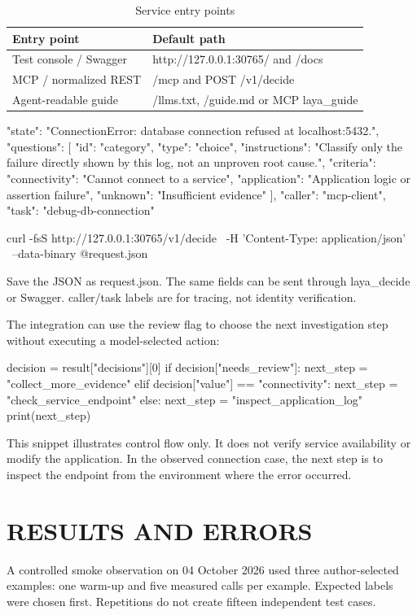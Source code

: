 \documentclass[10pt,a4paper]{article}
\begin{document}
\begin{table}[H]
\centering\small
\renewcommand{\arraystretch}{1.15}
\begin{tabularx}{\linewidth}{@{}YY@{}}
\toprule
\textbf{Entry point} & \textbf{Default path} \\
\midrule
Test console / Swagger & http://127.0.0.1:30765/  and  /docs \\
MCP / normalized REST & /mcp  and  POST /v1/decide \\
Agent-readable guide & /llms.txt, /guide.md or MCP laya\_guide \\
\bottomrule
\end{tabularx}
\caption{Service entry points}
\end{table}
\begin{Code}
{
  "state": "ConnectionError: database connection refused at localhost:5432.",
  "questions": [{
    "id": "category", "type": "choice",
    "instructions":
      "Classify only the failure directly shown by this log, not an unproven root cause.",
    "criteria": {
      "connectivity": "Cannot connect to a service",
      "application": "Application logic or assertion failure",
      "unknown": "Insufficient evidence"
    }
  }],
  "caller": "mcp-client", "task": "debug-db-connection"
}
\end{Code}
\begin{Code}
curl -fsS http://127.0.0.1:30765/v1/decide \
  -H 'Content-Type: application/json' \
  --data-binary @request.json
\end{Code}
Save the JSON as request.json. The same fields can be sent through laya\_decide or Swagger. caller/task labels are for tracing, not identity verification.


The integration can use the review flag to choose the next investigation step without executing a model-selected action:
\begin{Code}
decision = result["decisions"][0]
if decision["needs_review"]:
    next_step = "collect_more_evidence"
elif decision["value"] == "connectivity":
    next_step = "check_service_endpoint"
else:
    next_step = "inspect_application_log"
print(next_step)
\end{Code}
This snippet illustrates control flow only. It does not verify service availability or modify the application. In the observed connection case, the next step is to inspect the endpoint from the environment where the error occurred.

\section{RESULTS AND ERRORS}
A controlled smoke observation on 04 October 2026 used three author-selected examples: one warm-up and five measured calls per example. Expected labels were chosen first. Repetitions do not create fifteen independent test cases.
\end{document}
